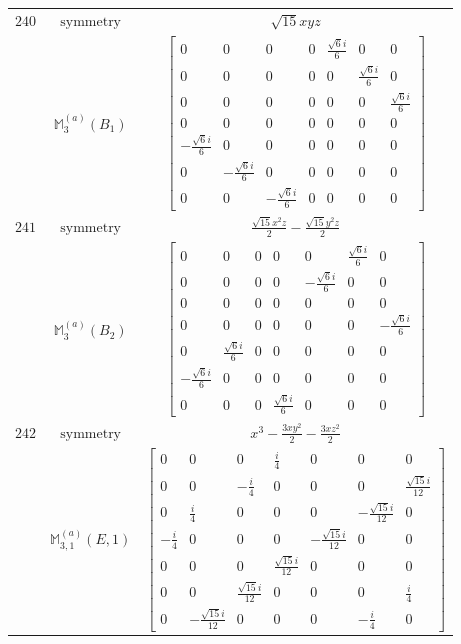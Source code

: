 \documentclass[fleqn,8pt,landscape]{jsarticle}
\begin{document}
\begin{longtable}{ccc}
$ 240 $ & $ \text{symmetry} $ & $ \sqrt{15} x y z $ \\
$  $ & $ \mathbb{M}_{3}^{(a)}(B_{1}) $ & $ \begin{bmatrix} 0 & 0 & 0 & 0 & \frac{\sqrt{6} i}{6} & 0 & 0 \\ 0 & 0 & 0 & 0 & 0 & \frac{\sqrt{6} i}{6} & 0 \\ 0 & 0 & 0 & 0 & 0 & 0 & \frac{\sqrt{6} i}{6} \\ 0 & 0 & 0 & 0 & 0 & 0 & 0 \\ - \frac{\sqrt{6} i}{6} & 0 & 0 & 0 & 0 & 0 & 0 \\ 0 & - \frac{\sqrt{6} i}{6} & 0 & 0 & 0 & 0 & 0 \\ 0 & 0 & - \frac{\sqrt{6} i}{6} & 0 & 0 & 0 & 0 \end{bmatrix} $ \\ \hline
$ 241 $ & $ \text{symmetry} $ & $ \frac{\sqrt{15} x^{2} z}{2} - \frac{\sqrt{15} y^{2} z}{2} $ \\
$  $ & $ \mathbb{M}_{3}^{(a)}(B_{2}) $ & $ \begin{bmatrix} 0 & 0 & 0 & 0 & 0 & \frac{\sqrt{6} i}{6} & 0 \\ 0 & 0 & 0 & 0 & - \frac{\sqrt{6} i}{6} & 0 & 0 \\ 0 & 0 & 0 & 0 & 0 & 0 & 0 \\ 0 & 0 & 0 & 0 & 0 & 0 & - \frac{\sqrt{6} i}{6} \\ 0 & \frac{\sqrt{6} i}{6} & 0 & 0 & 0 & 0 & 0 \\ - \frac{\sqrt{6} i}{6} & 0 & 0 & 0 & 0 & 0 & 0 \\ 0 & 0 & 0 & \frac{\sqrt{6} i}{6} & 0 & 0 & 0 \end{bmatrix} $ \\ \hline
$ 242 $ & $ \text{symmetry} $ & $ x^{3} - \frac{3 x y^{2}}{2} - \frac{3 x z^{2}}{2} $ \\
$  $ & $ \mathbb{M}_{3,1}^{(a)}(E,1) $ & $ \begin{bmatrix} 0 & 0 & 0 & \frac{i}{4} & 0 & 0 & 0 \\ 0 & 0 & - \frac{i}{4} & 0 & 0 & 0 & \frac{\sqrt{15} i}{12} \\ 0 & \frac{i}{4} & 0 & 0 & 0 & - \frac{\sqrt{15} i}{12} & 0 \\ - \frac{i}{4} & 0 & 0 & 0 & - \frac{\sqrt{15} i}{12} & 0 & 0 \\ 0 & 0 & 0 & \frac{\sqrt{15} i}{12} & 0 & 0 & 0 \\ 0 & 0 & \frac{\sqrt{15} i}{12} & 0 & 0 & 0 & \frac{i}{4} \\ 0 & - \frac{\sqrt{15} i}{12} & 0 & 0 & 0 & - \frac{i}{4} & 0 \end{bmatrix} $ \\ \hline

\end{longtable}
\end{document}

